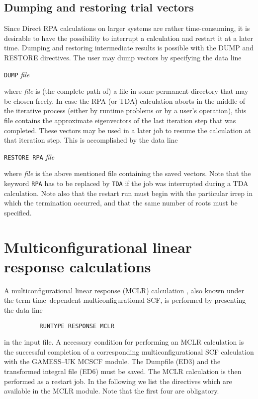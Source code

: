 \documentclass[11pt,fleqn]{article}
\begin{document}
\subsection{Dumping and restoring trial vectors}
Since Direct RPA calculations on larger systems are rather 
time-consuming, it is desirable to have the possibility to interrupt
a calculation and restart it at a later time.
Dumping and restoring intermediate results is possible with the DUMP
and RESTORE directives.
The user may dump vectors by specifying the data line
\begin{flushleft}
\mbox{}{\tt DUMP} {\em file}
\end{flushleft}
where {\em file} is (the complete path of) a file in some permanent
directory that may be chosen freely. In case the RPA (or TDA)
calculation aborts in the middle of the iterative process
(either by runtime problems or by a user's operation), this file
contains the approximate
eigenvectors of the last iteration step that was completed.
These vectors may be used in a later job to resume the calculation
at that iteration step. This is accomplished by the data line
\begin{flushleft}
\mbox{}{\tt RESTORE RPA} {\em file}
\end{flushleft}
where {\em file} is the above mentioned file containing the saved vectors.
Note that the keyword {\tt RPA} has to be replaced by {\tt TDA} if
the job was interrupted during a TDA calculation.
Note also that the restart run must begin with the particular irrep
in which the termination occurred, and that the
same number of roots must be specified.
%
\section{Multiconfigurational linear response calculations}
A multiconfigurational linear response (MCLR) calculation
\cite{ref:46}, also known under
the term time--dependent multiconfigurational SCF, is performed by
presenting the data line

{
\footnotesize
\begin{verbatim}
          RUNTYPE RESPONSE MCLR
\end{verbatim}
}
in the input file. A necessary condition for performing an MCLR
calculation is the successful completion of a corresponding
multiconfigurational SCF calculation with the GAMESS--UK MCSCF module.
The Dumpfile (ED3) and the transformed integral
file (ED6) must be saved. The MCLR calculation is then performed
as a restart job. In the following we list the directives which are
available in the MCLR module. Note that the first four are obligatory.
%
\end{document}
